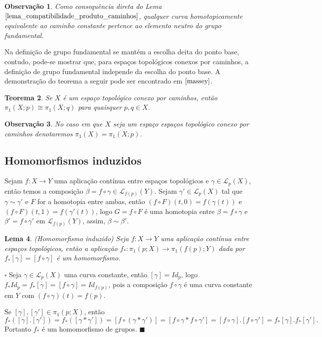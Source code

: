 \documentclass[12pt]{book}
\newtheorem{teorema}{Teorema}[section]
\newtheorem{lema}[teorema]{Lema}
\newtheorem{observacao}[teorema]{Observação}
\newenvironment{prova}[1]{$\square$ #1}{\hfill$\blacksquare$}
\newcommand{\caminhospontobasegeral}[2]{\mathcal{L}_{#1}(#2)}
\newcommand{\classe}[1]{[#1]}
\newcommand{\grupofundamental}[1]{\pi_{1}(#1)}
\newcommand{\grupofundamentalpontobase}[2]{\pi_{1}(#1; #2)}
\begin{document}
	
	\begin{observacao}
		Como consequência direta do Lema $\ref{lema_compatibilidade_produto_caminhos}$, qualquer curva homotopicamente equivalente ao caminho constante pertence ao elemento neutro do grupo fundamental.
	\end{observacao}
	
	Na definição de grupo fundamental se mantém a escolha deita do ponto base, contudo, pode-se mostrar que, para espaços topológicos conexos por caminhos, a definição de grupo fundamental independe da escolha do ponto base. A demonstração do teorema a seguir pode ser encontrado em $\cite{massey}$.
	
	\begin{teorema}
		Se $X$ é um espaço topológico conexo por caminhos, então $\grupofundamentalpontobase{X}{p} \cong \grupofundamentalpontobase{X}{q}$ para quaisquer $p,q \in X$.
	\end{teorema}
	
	\begin{observacao}
		No caso em que $X$ seja um espaço espaços topológico conexo por caminhos denotaremos $\grupofundamental{X}=\grupofundamentalpontobase{X}{p}$.
	\end{observacao}
	
	\subsection{Homomorfismos induzidos}
		Sejam $f:X\to Y$ uma aplicação contínua entre espaços topológicos e $\gamma \in \caminhospontobasegeral{p}{X}$, então temos a composição $\beta=f\circ \gamma \in \caminhospontobasegeral{f(p)}{Y}$. Sejam $\gamma' \in \caminhospontobasegeral{p}{X}$ tal que $\gamma \sim \gamma'$ e $F$ for a homotopia entre ambas, então $(f\circ F)(t,0) =  f(\gamma(t))$ e $(f\circ F)(t,1) =  f(\gamma'(t)) $, logo $G=f\circ F$ é uma homotopia entre $\beta=f\circ \gamma$ e $\beta' = f\circ \gamma'$ em $\caminhospontobasegeral{f(p)}{Y}$, assim, $\beta \sim \beta'$.
		
		\begin{lema}
			(Homomorfismo induzido) Seja $f:X\to Y$ uma aplicação contínua entre espaços topológicos, então a aplicação $f_{*}:\grupofundamentalpontobase{p}{X} \to \grupofundamentalpontobase{f(p)}{Y}$ dada por $f_{*}\classe{\gamma} = \classe{f\circ\gamma}$ é um homomorfismo.
		\end{lema}
		\begin{prova}
			Seja $\gamma \in \caminhospontobasegeral{p}{X}$ uma curva constante, então $\classe{\gamma} = Id_{p}$, logo $f_{*}Id_{p} = f_{*}\classe{\gamma} = \classe{f\circ\gamma} = Id_{f(p)}$, pois a composição $f\circ\gamma$ é uma curva constante em $Y$ com $(f\circ\gamma)(t) = f(p)$.
			
			Se $\classe{\gamma}, \classe{\gamma'}\in \grupofundamentalpontobase{p}{X}$, então 
			$$
			f_{*}(\classe{\gamma}.\classe{\gamma'}) = f_{*}(\classe{\gamma*\gamma'}) = \classe{f\circ(\gamma*\gamma')} = \classe{f\circ\gamma*f\circ\gamma'} =
			\classe{f\circ\gamma}.\classe{f\circ\gamma'}=	f_{*}\classe{\gamma}.f_{*}\classe{\gamma'}.
			$$
			Portanto $f_{*}$ é um homomorfismo de grupos.
		\end{prova}
		
\end{document}
